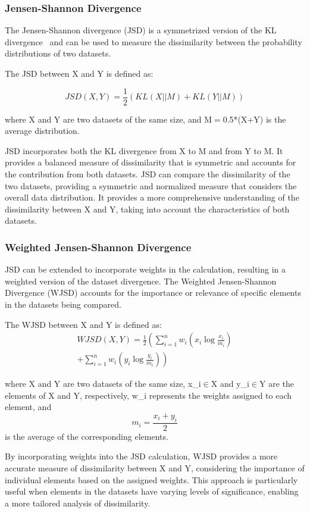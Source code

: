 \subsubsection{Jensen-Shannon Divergence}
The Jensen-Shannon divergence (JSD) is a symmetrized version of the KL divergence~\cite{ADD} and can be used to measure the dissimilarity between the probability distributions of two datasets.

The JSD between X and Y  is defined as:

\[JSD(X, Y) = \frac{1}{2} \left( KL(X || M)
  + KL(Y || M) \right)\]

where X and Y are two datasets of the same size, and M$=$0.5*(X+Y) is the average distribution.

JSD incorporates both the KL divergence from X to M and from Y to M. It provides a balanced measure of dissimilarity that is symmetric and accounts for the contribution from both datasets.
%
JSD can compare the dissimilarity of the two datasets, providing a symmetric and normalized measure that considers the overall data distribution.
%
It provides a more comprehensive understanding of the dissimilarity between X and Y, taking into account the characteristics of both datasets.

\subsubsection{Weighted Jensen-Shannon Divergence}
JSD can be extended to incorporate weights in the calculation, resulting in a weighted version of the dataset divergence. The Weighted Jensen-Shannon Divergence (WJSD) accounts for the importance or relevance of specific elements in the datasets being compared.

The WJSD between X and Y is defined as:
\begin{align*}
  WJSD(X, Y) = \frac{1}{2} \left( \sum_{i=1}^{n} w_i \left( x_i \log \frac{x_i}{m_i} \right) \right. \\
  \left. + \sum_{i=1}^{n} w_i \left( y_i \log \frac{y_i}{m_i} \right) \right)
\end{align*}

where X and Y are two datasets of the same size, x\_i$\in$X and y\_i$\in$Y are the elements of X and Y, respectively, w\_i represents the weights assigned to each element, and \[m_i = \frac{{x_i + y_i}}{2}\] is the average of the corresponding elements.

By incorporating weights into the JSD calculation, WJSD provides a more accurate measure of dissimilarity between X and Y, considering the importance of individual elements based on the assigned weights. This approach is particularly useful when elements in the datasets have varying levels of significance, enabling a more tailored analysis of dissimilarity.

